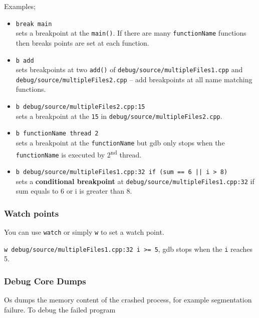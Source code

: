 Examples;
\begin{itemize}
  \item \texttt{break main} \\ 
    sets a breakpoint at the \texttt{main()}. If there are many \texttt{functionName} functions then breaks points are set at each function.

  \item \texttt{b add} \\
    sets breakpoints at two \texttt{add()} of \texttt{debug/source/multipleFiles1.cpp} and \texttt{debug/source/multipleFiles2.cpp} -- add breakpoints at all name matching functions.

  \item \texttt{b debug/source/multipleFiles2.cpp:15} \\
    sets a breakpoint at the \texttt{15} in \texttt{debug/source/multipleFiles2.cpp}.

  \item \texttt{b functionName thread 2} \\
    sets a breakpoint at the \texttt{functionName} but gdb only stops when the \texttt{functionName} is executed by 2\textsuperscript{nd} thread.
  \item \texttt{b debug/source/multipleFiles1.cpp:32 if (sum == 6 || i > 8)} \\
    sets a \textbf{conditional breakpoint} at \texttt{debug/source/multipleFiles1.cpp:32} if sum equals to 6 or i is greater than 8.
\end{itemize}






\subsubsection{Watch points}
You can use \texttt{watch} or simply \texttt{w} to set a watch point.


\texttt{w debug/source/multipleFiles1.cpp:32 i >= 5}, gdb stops when the \texttt{i} reaches 5.


\subsubsection{Debug Core Dumps}
Os dumps the memory content of the crashed process, for example segmentation failure.
To debug the failed program

